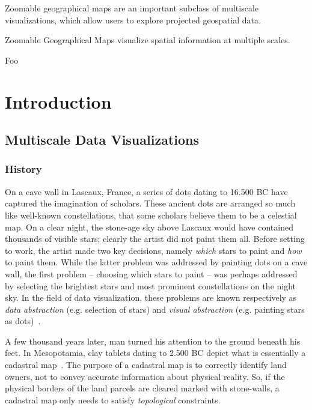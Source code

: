 \documentclass[11pt, oneside]{report}   	%
\begin{document}
Zoomable geographical maps are an important subclass of multiscale visualizations, which allow users to explore projected geospatial data. 





Zoomable Geographical Maps visualize spatial information at multiple scales.



Foo


\part{Introduction}

\chapter{Multiscale Data Visualizations}

\section{History}
\label{sec:history}
On a cave wall in Lascaux, France, a series of dots dating to 16.500 BC have captured the imagination of scholars. These ancient dots are arranged so much like well-known constellations, that some scholars believe them to be a celestial map. On a clear night, the stone-age sky above Lascaux would have contained thousands of visible stars; clearly the artist did not paint them all. Before setting to work, the artist made two key decisions, namely \emph{which} stars to paint and \emph{how} to paint them. While the latter problem was addressed by painting dots on a cave wall, the first problem -- choosing which stars to paint -- was perhaps addressed by selecting the brightest stars and most prominent constellations on the night sky. In the field of data visualization, these problems are known respectively as \emph{data abstraction} (e.g. selection of stars) and \emph{visual abstraction} (e.g. painting stars as dots)~\cite{stolte2003multiscale}.

A few thousand years later, man turned his attention to the ground beneath his feet. In Mesopotamia, clay tablets dating to 2.500 BC depict what is essentially a cadastral map~\cite{harley1987cartography}. The purpose of a cadastral map is to correctly identify land owners, not to convey accurate information about physical reality. So, if the physical borders of the land parcels are cleared marked with stone-walls, a cadastral map only needs to satisfy \emph{topological} constraints. 
\end{document}
